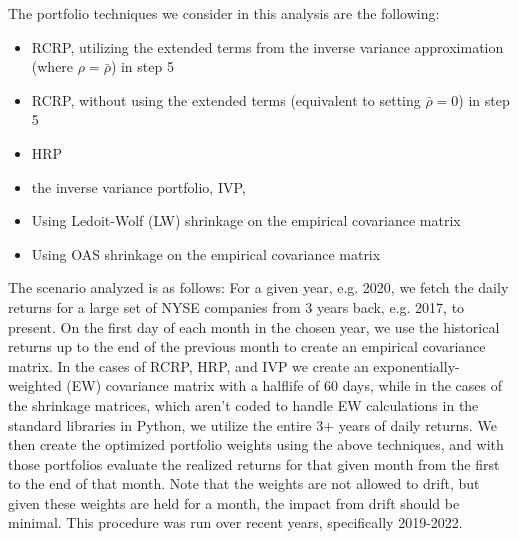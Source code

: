 \documentclass[10pt,twoside,titlepage]{article}   %
\begin{document}
The portfolio techniques we consider in this analysis are the following:
\begin{itemize}
\item RCRP, utilizing the extended terms from the inverse variance approximation (where $\rho=\bar{\rho}$) in step 5
\item RCRP, without using the extended terms (equivalent to setting $\bar{\rho}=0$) in step 5
\item HRP
\item the inverse variance portfolio, IVP, 
\item Using Ledoit-Wolf (LW) shrinkage on the empirical covariance matrix
\item Using OAS shrinkage on the empirical covariance matrix
\end{itemize}
The scenario analyzed is as follows: For a given year, e.g. 2020, we fetch the daily returns for a large set of NYSE companies from 3 years back, e.g. 2017, to present. 
On the first day of each month in the chosen year, we use the historical returns up to the end of the previous month to create an empirical covariance matrix. 
In the cases of RCRP, HRP, and IVP we create an exponentially-weighted (EW) covariance matrix with a halflife of 60 days, 
while in the cases of the shrinkage matrices, which aren’t coded to handle EW calculations in the standard libraries in Python, 
we utilize the entire 3+ years of daily returns. 
We then create the optimized portfolio weights using the above techniques, 
and with those portfolios evaluate the realized returns for that given month from the first to the end of that month.
Note that the weights are not allowed to drift, but given these weights are held for a month, the impact from drift should be minimal.
This procedure was run over recent years, specifically 2019-2022.
\end{document}
